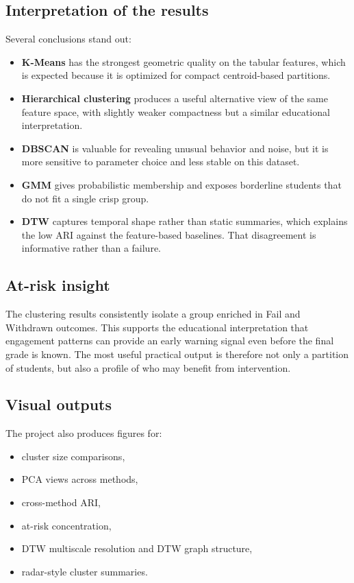 \documentclass[11pt,a4paper]{article}
\begin{document}
\subsection{Interpretation of the results}
Several conclusions stand out:
\begin{itemize}[leftmargin=*]
  \item \textbf{K-Means} has the strongest geometric quality on the tabular features, which is expected because it is optimized for compact centroid-based partitions.
  \item \textbf{Hierarchical clustering} produces a useful alternative view of the same feature space, with slightly weaker compactness but a similar educational interpretation.
  \item \textbf{DBSCAN} is valuable for revealing unusual behavior and noise, but it is more sensitive to parameter choice and less stable on this dataset.
  \item \textbf{GMM} gives probabilistic membership and exposes borderline students that do not fit a single crisp group.
  \item \textbf{DTW} captures temporal shape rather than static summaries, which explains the low ARI against the feature-based baselines. That disagreement is informative rather than a failure.
\end{itemize}

\subsection{At-risk insight}
The clustering results consistently isolate a group enriched in Fail and Withdrawn outcomes. This supports the educational interpretation that engagement patterns can provide an early warning signal even before the final grade is known. The most useful practical output is therefore not only a partition of students, but also a profile of who may benefit from intervention.

\subsection{Visual outputs}
The project also produces figures for:
\begin{itemize}[leftmargin=*]
  \item cluster size comparisons,
  \item PCA views across methods,
  \item cross-method ARI,
  \item at-risk concentration,
  \item DTW multiscale resolution and DTW graph structure,
  \item radar-style cluster summaries.
\end{itemize}
\end{document}
